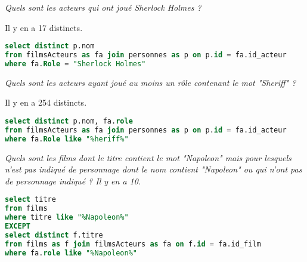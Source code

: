 \begin{Exercise} \it Quels sont les acteurs qui ont joué Sherlock Holmes ? 

Il y en a 17 distincts.
\end{Exercise}
\begin{Answer}
\begin{lstlisting}[language=SQL]
select distinct p.nom
from filmsActeurs as fa join personnes as p on p.id = fa.id_acteur
where fa.Role = "Sherlock Holmes"
\end{lstlisting}
\end{Answer}
\begin{Exercise} \it Quels sont les acteurs ayant joué au moins un rôle contenant le mot "Sheriff" ? 

Il y en a 254 distincts.
\end{Exercise}
\begin{Answer}
\begin{lstlisting}[language=SQL]
select distinct p.nom, fa.role
from filmsActeurs as fa join personnes as p on p.id = fa.id_acteur
where fa.Role like "%heriff%"
\end{lstlisting}
\end{Answer}
\begin{Exercise} \it Quels sont les films dont le titre contient le mot "Napoleon" mais pour lesquels n'est pas indiqué de personnage dont le nom contient "Napoleon" ou qui n'ont pas de personnage indiqué ? Il y en a 10.
\end{Exercise}
\begin{Answer}
\begin{lstlisting}[language=SQL]
select titre
from films 
where titre like "%Napoleon%" 
EXCEPT
select distinct f.titre
from films as f join filmsActeurs as fa on f.id = fa.id_film
where fa.role like "%Napoleon%" 
\end{lstlisting}
\newpage
\end{Answer}
